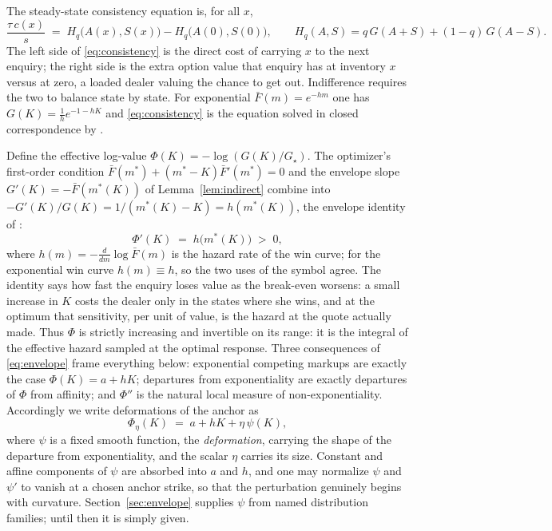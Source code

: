 \documentclass[11pt]{article}
\newcommand{\Fbar}{\bar F}
\begin{document}
The steady-state consistency equation is, for all $x$,
\begin{equation}
\frac{\tau\,c(x)}{s} \;=\; H_q\big(A(x), S(x)\big) - H_q\big(A(0), S(0)\big),
\qquad
H_q(A,S) = q\,G(A+S) + (1-q)\,G(A-S).
\label{eq:consistency}
\end{equation}
The left side of \eqref{eq:consistency} is the direct cost of carrying $x$ to the next enquiry; the right side is the extra option value that enquiry has at inventory $x$ versus at zero, a loaded dealer valuing the chance to get out. Indifference requires the two to balance state by state. For exponential $\Fbar(m) = e^{-hm}$ one has $G(K) = \tfrac1h e^{-1-hK}$ and \eqref{eq:consistency} is the equation solved in closed correspondence by \citet{cotton2026skew}.

Define the effective log-value $\Phi(K) = -\log(G(K)/G_\star)$. The optimizer's first-order condition $\Fbar(m^\ast) + (m^\ast - K)\Fbar'(m^\ast) = 0$ and the envelope slope $G'(K) = -\Fbar(m^\ast(K))$ of Lemma~\ref{lem:indirect} combine into $-G'(K)/G(K) = 1/(m^\ast(K) - K) = h(m^\ast(K))$, the envelope identity of \citet{cotton2026skew}:
\begin{equation}
\Phi'(K) \;=\; h\big(m^\ast(K)\big) \;>\; 0,
\label{eq:envelope}
\end{equation}
where $h(m) = -\tfrac{d}{dm}\log\Fbar(m)$ is the hazard rate of the win curve; for the exponential win curve $h(m) \equiv h$, so the two uses of the symbol agree. The identity says how fast the enquiry loses value as the break-even worsens: a small increase in $K$ costs the dealer only in the states where she wins, and at the optimum that sensitivity, per unit of value, is the hazard at the quote actually made. Thus $\Phi$ is strictly increasing and invertible on its range: it is the integral of the effective hazard sampled at the optimal response. Three consequences of \eqref{eq:envelope} frame everything below:
exponential competing markups are exactly the case $\Phi(K) = a + hK$;
departures from exponentiality are exactly departures of $\Phi$ from affinity;
and $\Phi''$ is the natural local measure of non-exponentiality. Accordingly we write deformations of the anchor as
\begin{equation}
\Phi_\eta(K) \;=\; a + hK + \eta\,\psi(K),
\label{eq:deformation}
\end{equation}
where $\psi$ is a fixed smooth function, the \emph{deformation}, carrying the shape of the departure from exponentiality, and the scalar $\eta$ carries its size. Constant and affine components of $\psi$ are absorbed into $a$ and $h$, and one may normalize $\psi$ and $\psi'$ to vanish at a chosen anchor strike, so that the perturbation genuinely begins with curvature. Section~\ref{sec:envelope} supplies $\psi$ from named distribution families; until then it is simply given.
\end{document}

